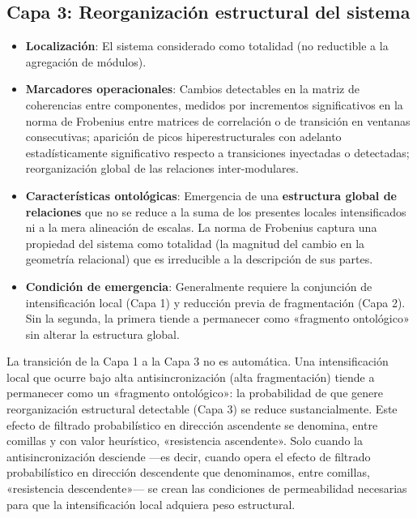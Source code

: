 \subsection{Capa 3: Reorganización estructural del sistema}

\begin{itemize}
    \item \textbf{Localización}: El sistema considerado como totalidad (no reductible a la agregación de módulos).
    \item \textbf{Marcadores operacionales}: Cambios detectables en la matriz de coherencias entre componentes, medidos por incrementos significativos en la norma de Frobenius entre matrices de correlación o de transición en ventanas consecutivas; aparición de picos hiperestructurales con adelanto estadísticamente significativo respecto a transiciones inyectadas o detectadas; reorganización global de las relaciones inter-modulares.
    \item \textbf{Características ontológicas}: Emergencia de una \textbf{estructura global de relaciones} que no se reduce a la suma de los presentes locales intensificados ni a la mera alineación de escalas. La norma de Frobenius captura una propiedad del sistema como totalidad (la magnitud del cambio en la geometría relacional) que es irreducible a la descripción de sus partes.
    \item \textbf{Condición de emergencia}: Generalmente requiere la conjunción de intensificación local (Capa 1) y reducción previa de fragmentación (Capa 2). Sin la segunda, la primera tiende a permanecer como «fragmento ontológico» sin alterar la estructura global.
\end{itemize}

\begin{importantbox}
La transición de la Capa 1 a la Capa 3 no es automática. Una intensificación local que ocurre bajo alta antisincronización (alta fragmentación) tiende a permanecer como un «fragmento ontológico»: la probabilidad de que genere reorganización estructural detectable (Capa 3) se reduce sustancialmente. Este efecto de filtrado probabilístico en dirección ascendente se denomina, entre comillas y con valor heurístico, «resistencia ascendente». Solo cuando la antisincronización desciende —es decir, cuando opera el efecto de filtrado probabilístico en dirección descendente que denominamos, entre comillas, «resistencia descendente»— se crean las condiciones de permeabilidad necesarias para que la intensificación local adquiera peso estructural.
\end{importantbox}

